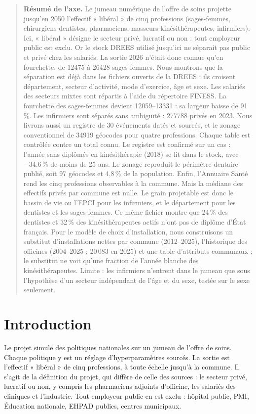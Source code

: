 \begin{quote}\small\textbf{Résumé de l'axe.} Le jumeau numérique de l'offre de soins projette jusqu'en 2050 l'effectif « libéral » de cinq professions
(sages-femmes, chirurgiens-dentistes, pharmaciens, masseurs-kinésithérapeutes, infirmiers). Ici, « libéral »
désigne le secteur privé, lucratif ou non : tout employeur public est exclu. Or le stock DREES utilisé jusqu'ici
ne séparait pas public et privé chez les salariés. La sortie 2026 n'était donc connue qu'en fourchette, de
\num{12475} à \num{26428} sages-femmes. Nous montrons que la séparation est déjà dans les fichiers ouverts de la
DREES : ils croisent département, secteur d'activité, mode d'exercice, âge et sexe. Les salariés des secteurs
mixtes sont répartis à l'aide du répertoire FINESS. La fourchette des sages-femmes devient
\num{12059}--\num{13331}\mesure{} : sa largeur baisse de 91\,\%\derive{}. Les infirmiers sont séparés sans
ambiguïté : \num{277788} privés en 2023\mesure{}. Nous livrons aussi un registre de 30 événements datés et
sourcés, et le zonage conventionnel de \num{34919} géocodes pour quatre professions. Chaque table est contrôlée
contre un total connu. Le registre est confirmé sur un cas : l'année sans diplômés en kinésithérapie (2018) se
lit dans le stock, avec \num{-34.6}\,\% de moins de 25 ans\mesure{}. Le zonage reproduit le périmètre dentaire
publié, soit 97 géocodes et 4,8\,\% de la population\mesure{}. Enfin, l'Annuaire Santé rend les cinq
professions observables à la commune. Mais la médiane des effectifs privés par commune est nulle. Le grain
projetable est donc le bassin de vie ou l'EPCI pour les infirmiers, et le département pour les dentistes et les
sages-femmes. Ce même fichier montre que 24\,\% des dentistes et 32\,\% des kinésithérapeutes actifs n'ont pas
de diplôme d'État français\mesure{}. Pour le modèle de choix d'installation, nous construisons un substitut
d'installations nettes par commune (2012--2025), l'historique des officines (2004--2025 ; 20\,083 en 2025) et une
table d'attributs communaux ; le substitut ne voit qu'une fraction de l'année blanche des kinésithérapeutes. Limite : les infirmiers n'entrent dans le jumeau que sous l'hypothèse d'un
secteur indépendant de l'âge et du sexe, testée sur le sexe seulement.\end{quote}

\section{Introduction}
Le projet simule des politiques nationales sur un jumeau de l'offre de soins. Chaque politique y est un
réglage d'hyperparamètres sourcés. La sortie est l'effectif « libéral » de cinq professions, à toute échelle
jusqu'à la commune. Il s'agit de la définition du projet, qui diffère de celle des sources : le secteur privé,
lucratif ou non, y compris les pharmaciens adjoints d'officine, les salariés des cliniques et l'industrie. Tout
employeur public en est exclu : hôpital public, PMI, Éducation nationale, EHPAD publics, centres municipaux.

